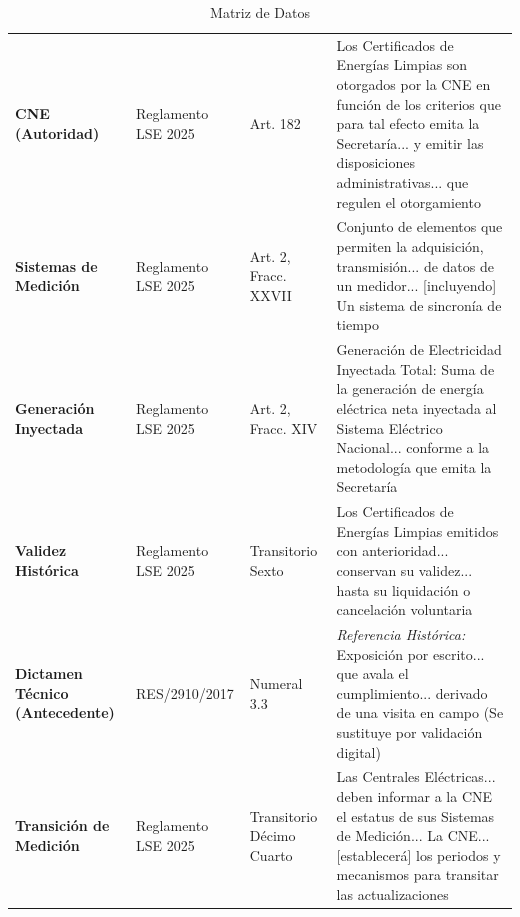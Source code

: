 \documentclass{cel}
\begin{document}
\vspace{0.3cm}
\begin{tabladoradoLargo}
\renewcommand{\tabularxcolumn}[1]{p{#1}}
\begin{xltabular}{\textwidth}{|X|X|X|X|}
\caption{Matriz de Datos} \\
\toprule
{}  &  &  &  \\
\midrule
\endhead
\textbf{CNE (Autoridad)} & Reglamento LSE 2025 & Art. 182 & \textquotedbl{}Los Certificados de Energías Limpias son otorgados por la CNE en función de los criterios que para tal efecto emita la Secretaría... y emitir las disposiciones administrativas... que regulen el otorgamiento\textquotedbl{} \\ \hline
\textbf{Sistemas de Medición} & Reglamento LSE 2025 & Art. 2, Fracc. XXVII & \textquotedbl{}Conjunto de elementos que permiten la adquisición, transmisión... de datos de un medidor... [incluyendo] Un sistema de sincronía de tiempo\textquotedbl{} \\ \hline
\textbf{Generación Inyectada} & Reglamento LSE 2025 & Art. 2, Fracc. XIV & \textquotedbl{}Generación de Electricidad Inyectada Total: Suma de la generación de energía eléctrica neta inyectada al Sistema Eléctrico Nacional... conforme a la metodología que emita la Secretaría\textquotedbl{} \\ \hline
\textbf{Validez Histórica} & Reglamento LSE 2025 & Transitorio Sexto & \textquotedbl{}Los Certificados de Energías Limpias emitidos con anterioridad... conservan su validez... hasta su liquidación o cancelación voluntaria\textquotedbl{} \\ \hline
\textbf{Dictamen Técnico (Antecedente)} & RES/2910/2017 & Numeral 3.3 & \textit{Referencia Histórica:} \textquotedbl{}Exposición por escrito... que avala el cumplimiento... derivado de una visita en campo\textquotedbl{} (Se sustituye por validación digital) \\ \hline
\textbf{Transición de Medición} & Reglamento LSE 2025 & Transitorio Décimo Cuarto & \textquotedbl{}Las Centrales Eléctricas... deben informar a la CNE el estatus de sus Sistemas de Medición... La CNE... [establecerá] los periodos y mecanismos para transitar las actualizaciones\textquotedbl{} \\ \hline
\bottomrule
\end{xltabular}
\end{tabladoradoLargo}
\end{document}

